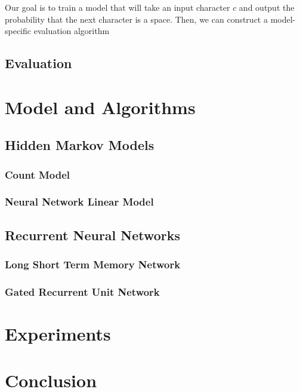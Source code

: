 \documentclass[11pt]{article}
\begin{document}
Our goal is to train a model that will take an input character $c$ and output the probability that the next character is a space. Then, we can construct a model-specific evaluation algorithm 

\subsection{Evaluation}



\section{Model and Algorithms}

\subsection{Hidden Markov Models}

\subsubsection{Count Model}

\subsubsection{Neural Network Linear Model}

\subsection{Recurrent Neural Networks}

\subsubsection{Long Short Term Memory Network}

\subsubsection{Gated Recurrent Unit Network}

\section{Experiments}

\section{Conclusion}



\end{document}

